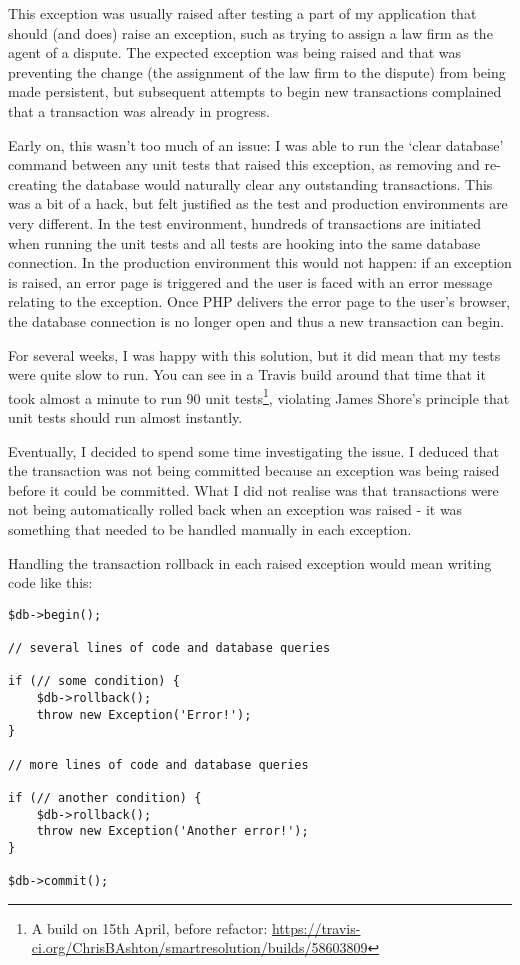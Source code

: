 This exception was usually raised after testing a part of my application that should (and does) raise an exception, such as trying to assign a law firm as the agent of a dispute. The expected exception was being raised and that was preventing the change (the assignment of the law firm to the dispute) from being made persistent, but subsequent attempts to begin new transactions complained that a transaction was already in progress.

Early on, this wasn't too much of an issue: I was able to run the `clear database' command between any unit tests that raised this exception, as removing and re-creating the database would naturally clear any outstanding transactions. This was a bit of a hack, but felt justified as the test and production environments are very different. In the test environment, hundreds of transactions are initiated when running the unit tests and all tests are hooking into the same database connection. In the production environment this would not happen: if an exception is raised, an error page is triggered and the user is faced with an error message relating to the exception. Once PHP delivers the error page to the user's browser, the database connection is no longer open and thus a new transaction can begin.

For several weeks, I was happy with this solution, but it did mean that my tests were quite slow to run. You can see in a Travis build around that time that it took almost a minute to run 90 unit tests\footnote{A build on 15th April, before refactor: \url{https://travis-ci.org/ChrisBAshton/smartresolution/builds/58603809}}, violating James Shore's principle that unit tests should run almost instantly.

Eventually, I decided to spend some time investigating the issue. I deduced that the transaction was not being committed because an exception was being raised before it could be committed. What I did not realise was that transactions were not being automatically rolled back when an exception was raised - it was something that needed to be handled manually in each exception.

Handling the transaction rollback in each raised exception would mean writing code like this:

\begin{minipage}{\textwidth}
\begin{lstlisting}
$db->begin();

// several lines of code and database queries

if (// some condition) {
    $db->rollback();
    throw new Exception('Error!');
}

// more lines of code and database queries

if (// another condition) {
    $db->rollback();
    throw new Exception('Another error!');
}

$db->commit();
\end{lstlisting}
\end{minipage}

